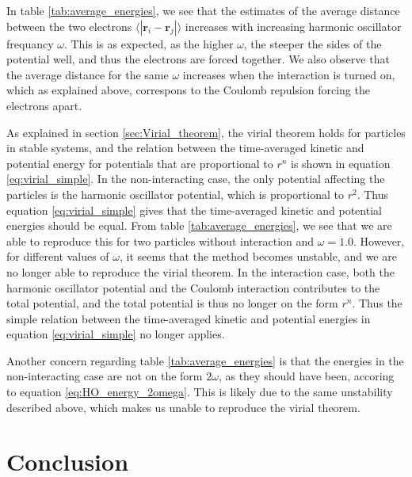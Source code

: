 \documentclass[norsk,a4paper,12pt]{article}
\begin{document}
In table \ref{tab:average_energies}, we see that the estimates of the average distance between the two electrons $\langle |\boldsymbol{r}_i-\boldsymbol{r}_j|\rangle$ increases with increasing harmonic oscillator frequancy $\omega$. This is as expected, as the higher $\omega$, the steeper the sides of the potential well, and thus the electrons are forced together. We also observe that the average distance for the same $\omega$ increases when the interaction is turned on, which as explained above, correspons to the Coulomb repulsion forcing the electrons apart.
\par 
\vspace{3mm}

As explained in section \ref{sec:Virial_theorem}, the virial theorem holds for particles in stable systems, and the relation between the time-averaged kinetic and potential energy for potentials that are proportional to $r^n$ is shown in equation \ref{eq:virial_simple}. In the non-interacting case, the only potential affecting the particles is the harmonic oscillator potential, which is proportional to $r^2$. Thus equation \ref{eq:virial_simple} gives that the time-averaged kinetic and potential energies should be equal. From table \ref{tab:average_energies}, we see that we are able to reproduce this for two particles without interaction and $\omega=1.0$. However, for different values of $\omega$, it seems that the method becomes unstable, and we are no longer able to reproduce the virial theorem. In the interaction case, both the harmonic oscillator potential and the Coulomb interaction contributes to the total potential, and the total potential is thus no longer on the form $r^n$. Thus the simple relation between the time-averaged kinetic and potential energies in equation \ref{eq:virial_simple} no longer applies.
\par 
\vspace{3mm}

Another concern regarding table \ref{tab:average_energies} is that the energies in the non-interacting case are not on the form $2 \omega$, as they should have been, accoring to equation \ref{eq:HO_energy_2omega}. This is likely due to the same unstability described above, which makes us unable to reproduce the virial theorem. 

\section{Conclusion} \label{sec:Conclusion} 


\newpage
\end{document}

